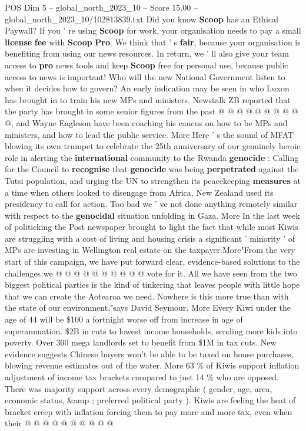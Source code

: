 \begin{textsample}{POS Dim 5 – global\_north\_2023\_10 – Score 15.00 – global\_north\_2023\_10/102813839.txt}
Did you know \textbf{Scoop} has an Ethical Paywall?
If you ' re using \textbf{Scoop} for work, your organisation needs to pay a small \textbf{license} \textbf{fee} with \textbf{Scoop} \textbf{Pro}.
We think that ' s \textbf{fair}, because your organisation is benefiting from using our news resources.
In return, we ' ll also give your team access to \textbf{pro} news tools and keep \textbf{Scoop} free for personal use, because public access to news is important!
Who will the new National Government listen to when it decides how to govern?
An early indication may be seen in who Luxon has brought in to train his new MPs and ministers.
Newstalk ZB reported that the party has brought in some senior figures from the past @ @ @ @ @ @ @ @ @ @, and Wayne Eagleson have been coaching his caucus on how to be MPs and ministers, and how to lead the public service.
More Here ' s the sound of MFAT blowing its own trumpet to celebrate the 25th anniversary of our genuinely heroic role in alerting the \textbf{international} community to the Rwanda \textbf{genocide} : Calling for the Council to \textbf{recognise} that \textbf{genocide} was being \textbf{perpetrated} against the Tutsi population, and urging the UN to strengthen its peacekeeping \textbf{measures} at a time when others looked to disengage from Africa, New Zealand used its presidency to call for action.
Too bad we ' ve not done anything remotely similar with respect to the \textbf{genocidal} situation unfolding in Gaza.
More In the last week of politicking the Post newspaper brought to light the fact that while most Kiwis are struggling with a cost of living and housing crisis a significant ' minority ' of MPs are investing in Wellington real estate on the taxpayer.More"From the very start of this campaign, we have put forward clear, evidence-based solutions to the challenges we @ @ @ @ @ @ @ @ @ @ vote for it.
All we have seen from the two biggest political parties is the kind of tinkering that leaves people with little hope that we can create the Aotearoa we need.
Nowhere is this more true than with the state of our environment,"says David Seymour.
More Every Kiwi under the age of 44 will be \$100 a fortnight worse off from increase in age of superannuation. \$2B in cuts to lowest income households, sending more kids into poverty.
Over 300 mega landlords set to benefit from \$1M in tax cuts.
New evidence suggests Chinese buyers won't be able to be taxed on house purchases, blowing revenue estimates out of the water.
More 63 \% of Kiwis support inflation adjustment of income tax brackets compared to just 14 \% who are opposed.
There was majority support across every demographic ( gender, age, area, economic status, \&amp ; preferred political party ).
Kiwis are feeling the heat of bracket creep with inflation forcing them to pay more and more tax, even when their @ @ @ @ @ @ @ @ @ @

\end{textsample}
